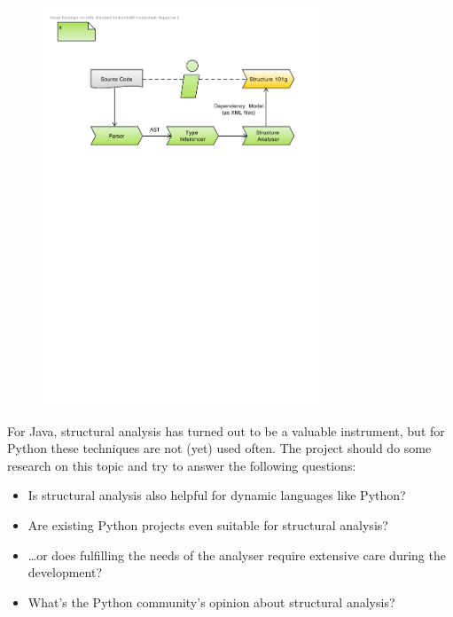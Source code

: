 \documentclass[12pt,halfparskip]{scrartcl}
\begin{document}
\begin{figure}[h] \centering
\includegraphics[width=0.75\textwidth]{big_picture}
\end{figure}

For Java, structural analysis has turned out to be a valuable instrument, but for Python these techniques are not (yet) used often. The project should do some research on this topic and try to answer the following questions:

\begin{itemize}
	\item Is structural analysis also helpful for dynamic languages like Python?
	\item Are existing Python projects even suitable for structural analysis?
	\item \ldots or does fulfilling the needs of the analyser require extensive care during the development?
	\item What's the Python community's opinion about structural analysis?
\end{itemize}
\end{document}
